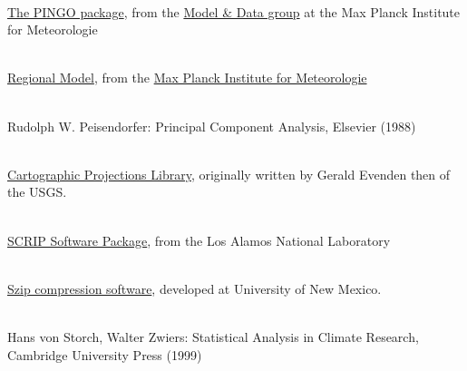 \begin{thebibliography}{xx}
 \ \\
  \href{http://www.mad.zmaw.de/Pingo/post/down/BigPingo.pdf}{The PINGO package},
  from the
  \href{http://www.mad.zmaw.de}{Model \& Data group}
  at the Max Planck Institute for Meteorologie


 \ \\
  \href{http://www.mpimet.mpg.de/en/wissenschaft/atmosphaere-im-erdsystem/arbeitsgruppen/regionale-klimamodellierung.html}
       {Regional Model},
  from the
  \href{http://www.mpimet.mpg.de}
       {Max Planck Institute for Meteorologie}


 \ \\
  Rudolph W. Peisendorfer: Principal Component Analysis, Elsevier (1988)


 \ \\
  \href{http://trac.osgeo.org/proj/}{Cartographic Projections Library},
  originally written by Gerald Evenden then of the USGS.


 \ \\
  \href{http://climate.lanl.gov/Software/SCRIP}{SCRIP Software Package},
  from the Los Alamos National Laboratory


 \ \\
  \href{http://www.hdfgroup.org/doc_resource/SZIP}{Szip compression software},
  developed at University of New Mexico.


 \ \\
  Hans von Storch, Walter Zwiers: Statistical Analysis in Climate Research, Cambridge University Press (1999)

\end{thebibliography}
